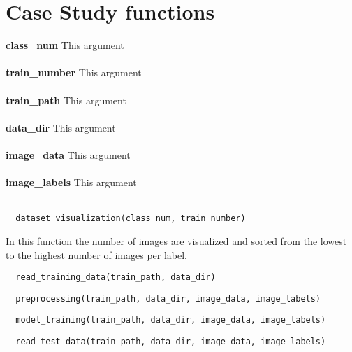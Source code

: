 \section{Case Study functions}
\label{sec:case_study_functions}

\textbf{class\_num}
This argument \\ \\
\textbf{train\_number}
This argument \\ \\
\textbf{train\_path}
This argument \\ \\
\textbf{data\_dir}
This argument \\ \\
\textbf{image\_data}
This argument \\ \\
\textbf{image\_labels}
This argument \\ \\

\begin{lstlisting}
  dataset_visualization(class_num, train_number)
\end{lstlisting}

\noindent In this function the number of images are visualized and sorted from the lowest to the highest number of images per label.

\begin{lstlisting}
  read_training_data(train_path, data_dir)
\end{lstlisting}

\begin{lstlisting}
  preprocessing(train_path, data_dir, image_data, image_labels)
\end{lstlisting}

\begin{lstlisting}
  model_training(train_path, data_dir, image_data, image_labels)
\end{lstlisting}

\begin{lstlisting}
  read_test_data(train_path, data_dir, image_data, image_labels)
\end{lstlisting}

